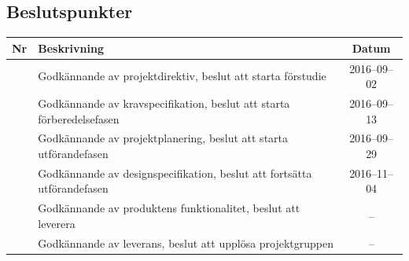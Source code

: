 \documentclass[a4paper,titlepage,12pt]{article}
\newcounter{bpNr}
\newcommand{\nextBPNr}{\stepcounter{bpNr}\arabic{bpNr}}
\begin{document}
	
	\subsection{Beslutspunkter}
	\renewcommand*{\arraystretch}{1.4}
    \begin{longtable}[c]{ c p{} c}
		\textbf{Nr} & \textbf{Beskrivning} & \textbf{Datum} \\ \midrule
		\nextBPNr{} & Godkännande av projektdirektiv, beslut att starta förstudie & 2016--09--02 \\ \midrule
		\nextBPNr{} & Godkännande av kravspecifikation, beslut att starta förberedelsefasen & 2016--09--13 \\ \midrule
		\nextBPNr{} & Godkännande av projektplanering, beslut att starta utförandefasen & 2016--09--29 \\ \midrule
		\nextBPNr{} & Godkännande av designspecifikation, beslut att fortsätta
		utförandefasen & 2016--11--04 \\ \midrule
		\nextBPNr{} & Godkännande av produktens funktionalitet, beslut att leverera & -- \\ \midrule
		\nextBPNr{} & Godkännande av leverans, beslut att upplösa projektgruppen & -- \\ \midrule
	\end{longtable}
	
	
\end{document}
